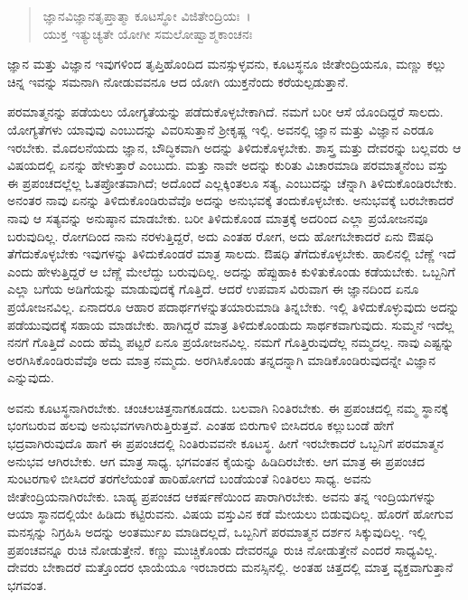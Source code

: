 \begin{verse}
ಜ್ಞಾನವಿಜ್ಞಾನತೃಪ್ತಾತ್ಮಾ ಕೂಟಸ್ಥೋ ವಿಜಿತೇಂದ್ರಿಯಃ~।\\ಯುಕ್ತ ಇತ್ಯುಚ್ಯತೇ ಯೋಗೀ ಸಮಲೋಷ್ವಾಶ್ಮಕಾಂಚನಃ 
\end{verse}

{\small ಜ್ಞಾನ ಮತ್ತು ವಿಜ್ಞಾನ ಇವುಗಳಿಂದ ತೃಪ್ತಿಹೊಂದಿದ ಮನಸ್ಸುಳ್ಳವನು, ಕೂಟಸ್ಥನೂ ಜೀತೇಂದ್ರಿಯನೂ, ಮಣ್ಣು ಕಲ್ಲು ಚಿನ್ನ ಇವನ್ನು ಸಮನಾಗಿ ನೋಡುವವನೂ ಆದ ಯೋಗಿ ಯುಕ್ತನೆಂದು ಕರೆಯಲ್ಪಡುತ್ತಾನೆ.}

ಪರಮಾತ್ಮನನ್ನು ಪಡೆಯಲು ಯೋಗ್ಯತೆಯನ್ನು ಪಡೆದುಕೊಳ್ಳಬೇಕಾಗಿದೆ. ನಮಗೆ ಬರೀ ಆಸೆ ಯೊಂದಿದ್ದರೆ ಸಾಲದು. ಯೋಗ್ಯತೆಗಳು ಯಾವುವು ಎಂಬುದನ್ನು ವಿವರಿಸುತ್ತಾನೆ ಶ‍್ರೀಕೃಷ್ಣ ಇಲ್ಲಿ. ಅವನಲ್ಲಿ ಜ್ಞಾನ ಮತ್ತು ವಿಜ್ಞಾನ ಎರಡೂ ಇರಬೇಕು. ಮೊದಲನೆಯದು ಜ್ಞಾನ, ಬೌದ್ಧಿಕವಾಗಿ ಅದನ್ನು ತಿಳಿದುಕೊಳ್ಳಬೇಕು. ಶಾಸ್ತ್ರ ಮತ್ತು ದೇವರನ್ನು ಬಲ್ಲವರು ಆ ವಿಷಯದಲ್ಲಿ ಏನನ್ನು ಹೇಳುತ್ತಾರೆ ಎಂಬುದು. ಮತ್ತು ನಾವೇ ಅದನ್ನು ಕುರಿತು ವಿಚಾರಮಾಡಿ ಪರಮಾತ್ಮನೆಂಬ ವಸ್ತು ಈ ಪ್ರಪಂಚದಲ್ಲೆಲ್ಲ ಓತಪ್ರೋತವಾಗಿದೆ; ಅದೊಂದೆ ಎಲ್ಲಕ್ಕಿಂತಲೂ ಸತ್ಯ, ಎಂಬುದನ್ನು ಚೆನ್ನಾಗಿ ತಿಳಿದುಕೊಂಡಿರಬೇಕು. ಅನಂತರ ನಾವು ಏನನ್ನು ತಿಳಿದುಕೊಂಡಿರುವೆವೊ ಅದನ್ನು ಅನುಭವಕ್ಕೆ ತಂದುಕೊಳ್ಳಬೇಕು. ಅನುಭವಕ್ಕೆ ಬರಬೇಕಾದರೆ ನಾವು ಆ ಸತ್ಯವನ್ನು ಅನುಷ್ಠಾನ ಮಾಡಬೇಕು. ಬರೀ ತಿಳಿದುಕೊಂಡ ಮಾತ್ರಕ್ಕೆ ಅದರಿಂದ ಎಲ್ಲಾ ಪ್ರಯೋಜನವೂ ಬರುವುದಿಲ್ಲ. ರೋಗದಿಂದ ನಾನು ನರಳುತ್ತಿದ್ದರೆ, ಅದು ಎಂತಹ ರೋಗ, ಅದು ಹೋಗಬೇಕಾದರೆ ಏನು ಔಷಧಿ ತೆಗೆದುಕೊಳ್ಳಬೇಕು ಇವುಗಳನ್ನು ತಿಳಿದುಕೊಂಡರೆ ಮಾತ್ರ ಸಾಲದು. ಔಷಧಿ ತೆಗೆದುಕೊಳ್ಳಬೇಕು. ಹಾಲಿನಲ್ಲಿ ಬೆಣ್ಣೆ ಇದೆ ಎಂದು ಹೇಳುತ್ತಿದ್ದರೆ ಆ ಬೆಣ್ಣೆ ಮೇಲೆದ್ದು ಬರುವುದಿಲ್ಲ. ಅದನ್ನು ಹೆಪ್ಪುಹಾಕಿ ಕುಳಿತುಕೊಂಡು ಕಡೆಯಬೇಕು. ಒಬ್ಬನಿಗೆ ಎಲ್ಲಾ ಬಗೆಯ ಅಡಿಗೆಯನ್ನು ಮಾಡುವುದಕ್ಕೆ ಗೊತ್ತಿದೆ. ಆದರೆ ಉಪವಾಸ ವಿರುವಾಗ ಈ ಜ್ಞಾನದಿಂದ ಏನೂ ಪ್ರಯೋಜನವಿಲ್ಲ. ಏನಾದರೂ ಆಹಾರ ಪದಾರ್ಥಗಳನ್ನುತಯಾರುಮಾಡಿ ತಿನ್ನಬೇಕು. ಇಲ್ಲಿ ತಿಳಿದುಕೊಳ್ಳುವುದು ಅದನ್ನು ಪಡೆಯುವುದಕ್ಕೆ ಸಹಾಯ ಮಾಡಬೇಕು. ಹಾಗಿದ್ದರೆ ಮಾತ್ರ ತಿಳಿದುಕೊಂಡುದು ಸಾರ್ಥಕವಾಗುವುದು. ಸುಮ್ಮನೆ ಇದೆಲ್ಲ ನನಗೆ ಗೊತ್ತಿದೆ ಎಂದು ಹೆಮ್ಮೆ ಪಟ್ಟರೆ ಏನೂ ಪ್ರಯೋಜನವಿಲ್ಲ. ನಮಗೆ ಗೊತ್ತಿರುವುದೆಲ್ಲ ನಮ್ಮದಲ್ಲ. ನಾವು ಎಷ್ಟನ್ನು ಅರಗಿಸಿಕೊಂಡಿರುವೆವೊ ಅದು ಮಾತ್ರ ನಮ್ಮದು. ಅರಗಿಸಿಕೊಂಡು ತನ್ನದನ್ನಾಗಿ ಮಾಡಿಕೊಂಡಿರುವುದನ್ನೇ ವಿಜ್ಞಾನ ಎನ್ನುವುದು.

ಅವನು ಕೂಟಸ್ಥನಾಗಿರಬೇಕು. ಚಂಚಲಚಿತ್ತನಾಗಕೂಡದು. ಬಲವಾಗಿ ನಿಂತಿರಬೇಕು. ಈ ಪ್ರಪಂಚದಲ್ಲಿ ನಮ್ಮ ಸ್ಥಾನಕ್ಕೆ ಭಂಗಬರುವ ಹಲವು ಅನುಭವಗಳಾಗಿರುತ್ತಿರುತ್ತವೆ. ಎಂತಹ ಬಿರುಗಾಳಿ ಬೀಸಿದರೂ ಕಲ್ಲುಬಂಡೆ ಹೇಗೆ ಭದ್ರವಾಗಿರುವುದೊ ಹಾಗೆ ಈ ಪ್ರಪಂಚದಲ್ಲಿ ನಿಂತಿರುವವನೇ ಕೂಟಸ್ಥ. ಹೀಗೆ ಇರಬೇಕಾದರೆ ಒಬ್ಬನಿಗೆ ಪರಮಾತ್ಮನ ಅನುಭವ ಆಗಿರಬೇಕು. ಆಗ ಮಾತ್ರ ಸಾಧ್ಯ. ಭಗವಂತನ ಕೈಯನ್ನು ಹಿಡಿದಿರಬೇಕು. ಆಗ ಮಾತ್ರ ಈ ಪ್ರಪಂಚದ ಸುಂಟರಗಾಳಿ ಬೀಸಿದರೆ ತರಗೆಲೆಯಂತೆ ಹಾರಿಹೋಗದೆ ಬಂಡೆಯಂತೆ ನಿಂತಿರಲು ಸಾಧ್ಯ. ಅವನು ಜೀತೇಂದ್ರಿಯನಾಗಿರಬೇಕು. ಬಾಹ್ಯ ಪ್ರಪಂಚದ ಆಕರ್ಷಣೆಯಿಂದ ಪಾರಾಗಿರಬೇಕು. ಅವನು ತನ್ನ ಇಂದ್ರಿಯಗಳನ್ನು ಆಯಾ ಸ್ಥಾನದಲ್ಲಿಯೇ ಹಿಡಿದು ಕಟ್ಟಿರುವನು. ವಿಷಯ ವಸ್ತುವಿನ ಕಡೆ ಮೇಯಲು ಬಿಡುವುದಿಲ್ಲ. ಹೊರಗೆ ಹೋಗುವ ಮನಸ್ಸನ್ನು ನಿಗ್ರಹಿಸಿ ಅದನ್ನು ಅಂತರ್ಮುಖ ಮಾಡಿದಲ್ಲದೆ, ಒಬ್ಬನಿಗೆ ಪರಮಾತ್ಮನ ದರ್ಶನ ಸಿಕ್ಕುವುದಿಲ್ಲ. ಇಲ್ಲಿ ಪ್ರಪಂಚವನ್ನೂ ರುಚಿ ನೋಡುತ್ತೇನೆ. ಕಣ್ಣು ಮುಚ್ಚಿಕೊಂಡು ದೇವರನ್ನೂ ರುಚಿ ನೋಡುತ್ತೇನೆ ಎಂದರೆ ಸಾಧ್ಯವಿಲ್ಲ. ದೇವರು ಬೇಕಾದರೆ ಮತ್ತೊಂದರ ಛಾಯೆಯೂ ಇರಬಾರದು ಮನಸ್ಸಿನಲ್ಲಿ. ಅಂತಹ ಚಿತ್ತದಲ್ಲಿ ಮಾತ್ತ ವ್ಯಕ್ತವಾಗುತ್ತಾನೆ ಭಗವಂತ.

